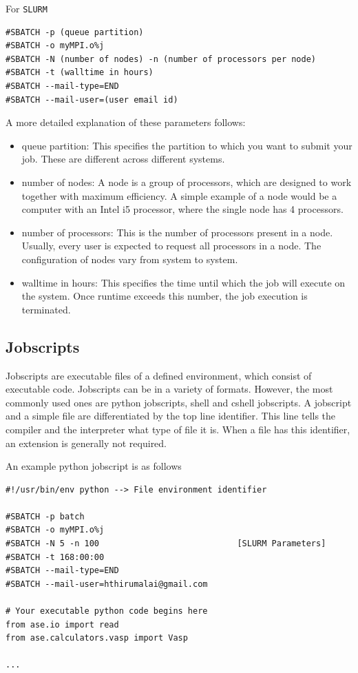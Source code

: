 \documentclass[11pt]{article}
\begin{document}
For \texttt{SLURM}

\begin{verbatim}
#SBATCH -p (queue partition)
#SBATCH -o myMPI.o%j
#SBATCH -N (number of nodes) -n (number of processors per node)
#SBATCH -t (walltime in hours)
#SBATCH --mail-type=END
#SBATCH --mail-user=(user email id)
\end{verbatim}

A more detailed explanation of these parameters follows:
\begin{itemize}
\item queue partition: This specifies the partition to which you want to submit your job. These are different across different systems.
\item number of nodes: A node is a group of processors, which are designed to work together with maximum efficiency. A simple example of a node would be a computer with an Intel i5 processor, where the single node has 4 processors.
\item number of processors: This is the number of processors present in a node. Usually, every user is expected to request all processors in a node. The configuration of nodes vary from system to system.
\item walltime in hours: This specifies the time until which the job will execute on the system. Once runtime exceeds this number, the job execution is terminated.
\end{itemize}

\subsection{Jobscripts}
\label{sec-3-2}
Jobscripts are executable files of a defined environment, which consist of executable code. Jobscripts can be in a variety of formats. However, the most commonly used ones are python jobscripts, shell and cshell jobscripts.
A jobscript and a simple file are differentiated by the top line identifier. This line tells the compiler and the interpreter what type of file it is. When a file has this identifier, an extension is generally not required. 

An example python jobscript is  as follows
\begin{verbatim}
#!/usr/bin/env python --> File environment identifier

#SBATCH -p batch
#SBATCH -o myMPI.o%j
#SBATCH -N 5 -n 100                            [SLURM Parameters]
#SBATCH -t 168:00:00
#SBATCH --mail-type=END
#SBATCH --mail-user=hthirumalai@gmail.com

# Your executable python code begins here
from ase.io import read
from ase.calculators.vasp import Vasp

...
\end{verbatim}
\end{document}
